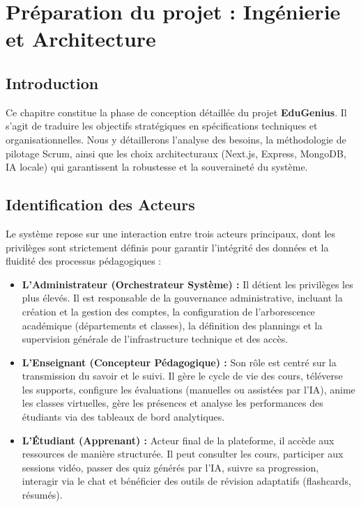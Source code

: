 \chapter{Préparation du projet : Ingénierie et Architecture}

\section*{Introduction}
Ce chapitre constitue la phase de conception détaillée du projet \textbf{EduGenius}. Il s'agit de traduire les objectifs stratégiques en spécifications techniques et organisationnelles. Nous y détaillerons l'analyse des besoins, la méthodologie de pilotage Scrum, ainsi que les choix architecturaux (Next.js, Express, MongoDB, IA locale) qui garantissent la robustesse et la souveraineté du système.


\section{Identification des Acteurs}

Le système repose sur une interaction entre trois acteurs principaux, dont les privilèges sont strictement définis pour garantir l'intégrité des données et la fluidité des processus pédagogiques :

\begin{itemize}
    \item \textbf{L’Administrateur (Orchestrateur Système) :} Il détient les privilèges les plus élevés. Il est responsable de la gouvernance administrative, incluant la création et la gestion des comptes, la configuration de l'arborescence académique (départements et classes), la définition des plannings et la supervision générale de l'infrastructure technique et des accès.
    \item \textbf{L’Enseignant (Concepteur Pédagogique) :} Son rôle est centré sur la transmission du savoir et le suivi. Il gère le cycle de vie des cours, téléverse les supports, configure les évaluations (manuelles ou assistées par l'IA), anime les classes virtuelles, gère les présences et analyse les performances des étudiants via des tableaux de bord analytiques.
    \item \textbf{L’Étudiant (Apprenant) :} Acteur final de la plateforme, il accède aux ressources de manière structurée. Il peut consulter les cours, participer aux sessions vidéo, passer des quiz générés par l'IA, suivre sa progression, interagir via le chat et bénéficier des outils de révision adaptatifs (flashcards, résumés).
\end{itemize}

